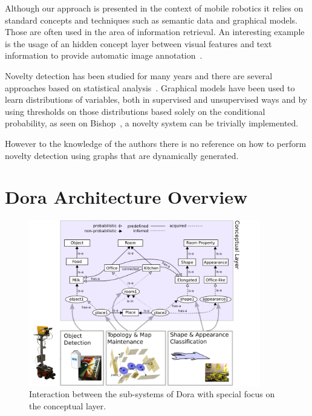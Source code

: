 \documentclass[runningheads,a4paper]{llncs}
\begin{document}
Although our approach is presented in the context of mobile robotics it relies on
standard concepts and techniques such as semantic data and graphical models.
Those are often used in the area of information retrieval.
An interesting example is the usage of an hidden concept layer between visual features
and text information to provide automatic image annotation~\cite{zhang2006probabilistic}.

Novelty detection has been studied for many years and there are several approaches
based on statistical analysis~\cite{markou2003novelty}.
Graphical models have been used to learn distributions of variables, both in
supervised and unsupervised ways and by using thresholds on those distributions
based solely on the conditional probability, as seen on Bishop~\cite{bishop1994novelty},
a novelty system can be trivially implemented.

However to the knowledge of the authors there is no reference on how to perform
novelty detection using graphs that are dynamically generated.

\section{Dora Architecture Overview}
\label{sec:overview}

\begin{figure}[h]
\centering
\includegraphics[width=0.9\textwidth]{figures/processes.pdf}
\caption{\label{fig:conceptual-layer}Interaction between the sub-systems
         of Dora with special focus on the conceptual layer.}
\end{figure}
\end{document}

